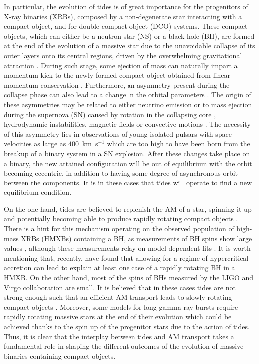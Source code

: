 \documentclass{aa}
\begin{document}
In particular, the evolution of tides is of great importance for the progenitors of X-ray binaries (XRBs), composed by a non-degenerate
star interacting with a compact object, and for double compact object (DCO) systems. These compact objects, which can either be a neutron
star (NS) or a black hole (BH), are formed at the end of the evolution of a massive star due to the unavoidable collapse of its outer
layers onto its central regions, driven by the overwhelming gravitational attraction \citep{hoyle1960,janka2012}. During such stage, some
ejection of mass can naturally impart a momentum kick to the newly formed compact object obtained from linear momentum conservation
\citep{blaauw1961}. Furthermore, an asymmetry present during the collapse phase can also lead to a change in the orbital parameters
\citep{kalogera1996}. The origin of these asymmetries may be related to either neutrino emission
\citep[][and references therein]{scheck2006} or to mass ejection during the supernova (SN) caused by rotation in the collapsing core
\citep{kotake2003}, hydrodynamic instabilities, magnetic fields or convective motions \citep{herant1994, burrows1995, janka1996, keil1996}.
The necessity of this asymmetry lies in observations of young isolated pulsars with space velocities as large as $400$~km~s$^{-1}$
\citep{hobbs2005} which are too high to have been born from the breakup of a binary system in a SN explosion.
After these changes take place on a binary, the new attained configuration will be out of equilibrium with the orbit becoming eccentric,
in addition to having some degree of asynchronous orbit between the components. It is in these cases that tides will operate to find a new
equilibrium condition.

On the one hand, tides are believed to replenish the AM of a star, spinning it up and potentially becoming able to produce rapidly rotating
compact objects \citep{qin2019,belczynski2020,fishbach2021}. There is a hint for this mechanism operating on the observed population of
high-mass XRBs (HMXBs) containing a BH, as measurements of BH spins show large values \citep{miller2015}, although these measurements relay
on model-dependent fits \citep{belczynski2021}. It is worth mentioning that, recently, \citet{qin2022a} have found that allowing for a
regime of hypercritical accretion can lead to explain at least one case of a rapidly rotating BH in a HMXB. On the other hand, most of the
spins of BHs measured by the LIGO and Virgo collaboration \citep{abbott2021} are small. It is believed that in these cases tides are not
strong enough such that an efficient AM transport leads to slowly rotating compact objects \citep{qin2018,olejak2021,qin2022b}. Moreover,
some models for long gamma-ray bursts require rapidly rotating massive stars at the end of their evolution
\citep{woosley1993,paczynski1998} which could be achieved thanks to the spin up of the progenitor stars due to the action of tides. Thus,
it is clear that the interplay between tides and AM transport takes a fundamental role in shaping the different outcomes of the evolution
of massive binaries containing compact objects.
\end{document}
